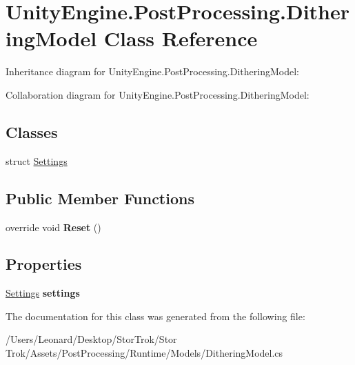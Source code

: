\hypertarget{class_unity_engine_1_1_post_processing_1_1_dithering_model}{}\section{Unity\+Engine.\+Post\+Processing.\+Dithering\+Model Class Reference}
\label{class_unity_engine_1_1_post_processing_1_1_dithering_model}


Inheritance diagram for Unity\+Engine.\+Post\+Processing.\+Dithering\+Model\+:


Collaboration diagram for Unity\+Engine.\+Post\+Processing.\+Dithering\+Model\+:
\subsection*{Classes}
\begin{DoxyCompactItemize}
\item 
struct \hyperlink{struct_unity_engine_1_1_post_processing_1_1_dithering_model_1_1_settings}{Settings}
\end{DoxyCompactItemize}
\subsection*{Public Member Functions}
\begin{DoxyCompactItemize}
\item 
\mbox{\label{class_unity_engine_1_1_post_processing_1_1_dithering_model_a32230e9d0e5db63630764379fe5eb09e}} 
override void {\bfseries Reset} ()
\end{DoxyCompactItemize}
\subsection*{Properties}
\begin{DoxyCompactItemize}
\item 
\mbox{\label{class_unity_engine_1_1_post_processing_1_1_dithering_model_a5907987a25dc4f7f459cdafe704a0441}} 
\hyperlink{struct_unity_engine_1_1_post_processing_1_1_dithering_model_1_1_settings}{Settings} {\bfseries settings}
\end{DoxyCompactItemize}


The documentation for this class was generated from the following file\+:\begin{DoxyCompactItemize}
\item 
/\+Users/\+Leonard/\+Desktop/\+Stor\+Trok/\+Stor Trok/\+Assets/\+Post\+Processing/\+Runtime/\+Models/Dithering\+Model.\+cs\end{DoxyCompactItemize}
